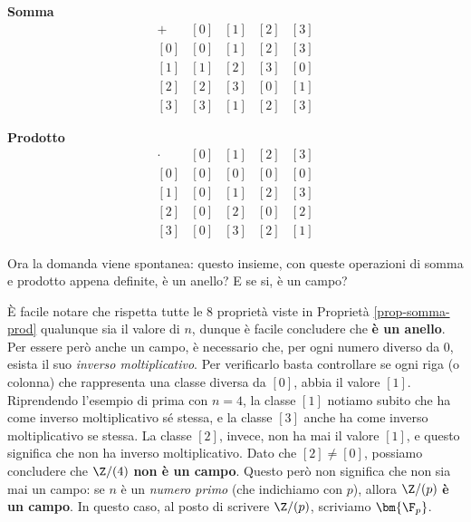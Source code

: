 \documentclass[11pt, a4paper, titlepage, oneside]{scrbook}
\begin{document}
\begin{minipage}[c]{0.45\textwidth}
    \centering
    \textbf{Somma}
    \vspace{-5pt}
    \[
    \begin{array}{c|cccc}
        + & [0] & [1] & [2] & [3] \\ \hline
        [0] & [0] & [1] & [2] & [3] \\{}
        [1] & [1] & [2] & [3] & [0] \\{}
        [2] & [2] & [3] & [0] & [1] \\{}
        [3] & [3] & [1] & [2] & [3]  
    \end{array}
    \]
\end{minipage}
\begin{minipage}[c]{0.45\textwidth}
    \centering
    \textbf{Prodotto}
    \vspace{-5pt}
    \[
    \begin{array}{c|cccc}
        \cdot & [0] & [1] & [2] & [3] \\ \hline
        [0] & [0] & [0] & [0] & [0] \\{}
        [1] & [0] & [1] & [2] & [3] \\{}
        [2] & [0] & [2] & [0] & [2] \\{}
        [3] & [0] & [3] & [2] & [1]  
    \end{array}
    \]
\end{minipage}

\bigskip

Ora la domanda viene spontanea: questo insieme, con queste operazioni di somma e prodotto appena definite, è un anello? E se si, è un campo? 

È facile notare che rispetta tutte le 8 proprietà viste in Proprietà \ref{prop-somma-prod} qualunque sia il valore di $n$, dunque è facile concludere che \textbf{è un anello}.\\ 
Per essere però anche un campo, è necessario che, per ogni numero diverso da $0$, esista il suo \textit{inverso moltiplicativo}. Per verificarlo basta controllare se ogni riga (o colonna) che rappresenta una classe diversa da $[0]$, abbia il valore $[1]$. 
Riprendendo l'esempio di prima con $n = 4$, la classe $[1]$ notiamo subito che ha come inverso moltiplicativo sé stessa, e la classe $[3]$ anche ha come inverso moltiplicativo se stessa. La classe $[2]$, invece, non ha mai il valore $[1]$, e questo significa che non ha inverso moltiplicativo. Dato che $[2] \neq [0]$, possiamo concludere che $\Z/(4)$ \textbf{non è un campo}.
Questo però non significa che non sia mai un campo: se $n$ è un \textit{numero primo} (che indichiamo con $p$), allora $\Z/(p)$ \textbf{è un campo}. In questo caso, al posto di scrivere $\Z/(p)$, scriviamo $\bm{\F_p}$.
\end{document}
